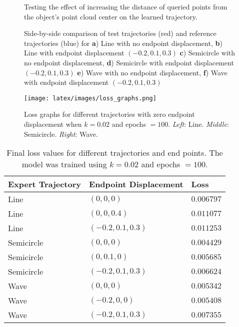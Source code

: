 \documentclass[10pt,twocolumn,letterpaper]{article}
\begin{document}
\begin{figure}[t]
\centering
\setlength\fboxsep{0pt}
\setlength\fboxrule{0.4pt}
\caption{Testing the effect of increasing the distance of queried points from the object's point cloud center on the learned trajectory.}
\label{fig:limit_comb}
\end{figure}

\begin{figure*}[h]
    \centering
    \caption{Side-by-side comparison of test trajectories (red) and reference trajectories (blue) for \textbf{a}) Line with no endpoint displacement, \textbf{b}) Line with endpoint displacement $(-0.2, 0.1, 0.3)$ \textbf{c}) Semicircle with no endpoint displacement, \textbf{d}) Semicircle with endpoint displacement $(-0.2, 0.1, 0.3)$ \textbf{e}) Wave with no endpoint displacement, \textbf{f}) Wave with endpoint displacement $(-0.2, 0.1, 0.3)$}
    \label{fig:result}
\end{figure*}

\begin{figure*}[h]
    \centering
    \texttt{[image: latex/images/loss\_graphs.png]}
    \caption{Loss graphs for different trajectories with zero endpoint displacement when $k = 0.02$ and epochs $= 100$. \textit{Left}: Line.  \textit{Middle}: Semicircle. \textit{Right}: Wave.}
    \label{fig:loss_graphs}
\end{figure*}

\begin{table}[t]
\begin{center}
\begin{tabular}{|l|l|l|}
\hline
Expert Trajectory & Endpoint Displacement & Loss \\
\hline\hline
Line        & $(0, 0, 0)$         & $0.006797$ \\
Line        & $(0, 0, 0.4)$       & $0.011077$ \\
Line        & $(-0.2, 0.1, 0.3)$  & $0.011253$ \\
Semicircle  & $(0, 0, 0)$         & $0.004429$ \\
Semicircle  & $(0, 0.1, 0)$       & $0.005685$ \\
Semicircle  & $(-0.2, 0.1, 0.3)$  & $0.006624$ \\
Wave        & $(0, 0, 0)$         & $0.005342$ \\
Wave        & $(-0.2, 0, 0)$      & $0.005408$ \\
Wave        & $(-0.2, 0.1, 0.3)$  & $0.007355$ \\
\hline
\end{tabular}
\end{center}
\caption{Final loss values for different trajectories and end points. The model was trained using $k = 0.02$ and epochs $= 100$.}
\label{tab:losses}
\end{table}
\end{document}
